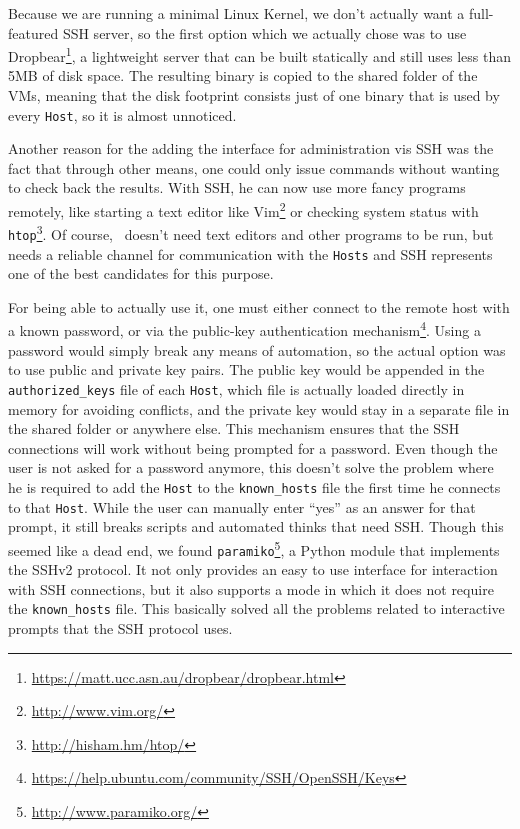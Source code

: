 Because we are running a minimal Linux Kernel, we don't actually want a full-featured SSH server, so the first option which we actually chose was to use Dropbear\footnote{\url{https://matt.ucc.asn.au/dropbear/dropbear.html}}, a lightweight server that can be built statically and still uses less than 5MB of disk space.
The resulting binary is copied to the shared folder of the VMs, meaning that the disk footprint consists just of one binary that is used by every \texttt{Host}, so it is almost unnoticed.

Another reason for the adding the interface for administration vis SSH was the fact that through other means, one could only issue commands without wanting to check back the results.
With SSH, he can now use more fancy programs remotely, like starting a text editor like Vim\footnote{\url{http://www.vim.org/}} or checking system status with \texttt{htop}\footnote{\url{http://hisham.hm/htop/}}.
Of course, \project\ doesn't need text editors and other programs to be run, but needs a reliable channel for communication with the \texttt{Hosts} and SSH represents one of the best candidates for this purpose.

For being able to actually use it, one must either connect to the remote host with a known password, or via the public-key authentication mechanism\footnote{\url{https://help.ubuntu.com/community/SSH/OpenSSH/Keys}}.
Using a password would simply break any means of automation, so the actual option was to use public and private key pairs.
The public key would be appended in the \texttt{authorized_keys} file of each \texttt{Host}, which file is actually loaded directly in memory for avoiding conflicts, and the private key would stay in a separate file in the shared folder or anywhere else.
This mechanism ensures that the SSH connections will work without being prompted for a password.
Even though the user is not asked for a password anymore, this doesn't solve the problem where he is required to add the \texttt{Host} to the \texttt{known_hosts} file the first time he connects to that \texttt{Host}.
While the user can manually enter ``yes'' as an answer for that prompt, it still breaks scripts and automated thinks that need SSH.
Though this seemed like a dead end, we found \texttt{paramiko}\footnote{\url{http://www.paramiko.org/}}, a Python module that implements the SSHv2 protocol.
It not only provides an easy to use interface for interaction with SSH connections, but it also supports a mode in which it does not require the \texttt{known_hosts} file.
This basically solved all the problems related to interactive prompts that the SSH protocol uses.

